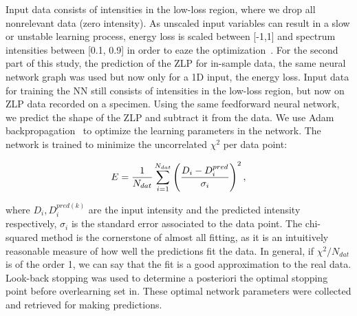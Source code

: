 %
Input data consists of intensities in the low-loss region, 
where we drop all nonrelevant data (zero intensity). As unscaled input variables
can result in a slow or unstable learning process,
energy loss is scaled between [-1,1] and spectrum intensities between [0.1, 0.9]
in order to eaze the optimization~\cite{Ball:2008by}.
%
For the second part of this study, the prediction of the ZLP for in-sample data,
the same neural network graph was used but now only for a 1D input, the energy loss. 
%
Input data for training the NN still consists of intensities in the low-loss region, 
but now on ZLP data recorded on a specimen. Using the same feedforward neural network,
we predict the shape of the ZLP and subtract it from the data.
%
We use Adam backpropagation~\cite{Adam} to optimize the learning parameters in the network. 
The network is trained to minimize the uncorrelated $\chi^2$ per data point:

\begin{equation}\label{eq:chi2}
\begin{centering}
    E = \frac{1}{N_{dat}}\sum_{i=1}^{N_{dat}}\left(\frac{D_i - D_i^{pred}}{\sigma_i}\right)^2, 
\end{centering}
\end{equation}

where $D_i, D_i^{pred(k)}$ are the input intensity and the predicted 
intensity respectively,
$\sigma_i$ is the standard error associated to the data point. 
%
The chi-squared method is the cornerstone of almost all fitting, as it is 
an intuitively reasonable measure of how well the predictions fit the data.
In general, if $\chi^2/N_{dat}$ is of the order 1, we can say that the fit is a 
good approximation to the real data. \\
%
Look-back stopping was used to determine a posteriori the optimal stopping point before 
overlearning set in. These optimal network parameters were collected and retrieved for 
making predictions\cite{hi(desktop)}.
%

